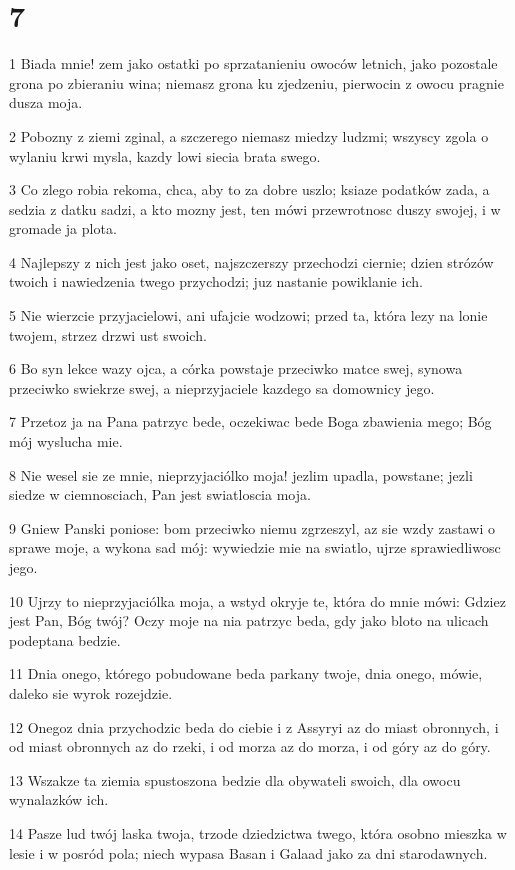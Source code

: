 \chapter{7}

\par 1 Biada mnie! zem jako ostatki po sprzatanieniu owoców letnich, jako pozostale grona po zbieraniu wina; niemasz grona ku zjedzeniu, pierwocin z owocu pragnie dusza moja.
\par 2 Pobozny z ziemi zginal, a szczerego niemasz miedzy ludzmi; wszyscy zgola o wylaniu krwi mysla, kazdy lowi siecia brata swego.
\par 3 Co zlego robia rekoma, chca, aby to za dobre uszlo; ksiaze podatków zada, a sedzia z datku sadzi, a kto mozny jest, ten mówi przewrotnosc duszy swojej, i w gromade ja plota.
\par 4 Najlepszy z nich jest jako oset, najszczerszy przechodzi ciernie; dzien strózów twoich i nawiedzenia twego przychodzi; juz nastanie powiklanie ich.
\par 5 Nie wierzcie przyjacielowi, ani ufajcie wodzowi; przed ta, która lezy na lonie twojem, strzez drzwi ust swoich.
\par 6 Bo syn lekce wazy ojca, a córka powstaje przeciwko matce swej, synowa przeciwko swiekrze swej, a nieprzyjaciele kazdego sa domownicy jego.
\par 7 Przetoz ja na Pana patrzyc bede, oczekiwac bede Boga zbawienia mego; Bóg mój wyslucha mie.
\par 8 Nie wesel sie ze mnie, nieprzyjaciólko moja! jezlim upadla, powstane; jezli siedze w ciemnosciach, Pan jest swiatloscia moja.
\par 9 Gniew Panski poniose: bom przeciwko niemu zgrzeszyl, az sie wzdy zastawi o sprawe moje, a wykona sad mój: wywiedzie mie na swiatlo, ujrze sprawiedliwosc jego.
\par 10 Ujrzy to nieprzyjaciólka moja, a wstyd okryje te, która do mnie mówi: Gdziez jest Pan, Bóg twój? Oczy moje na nia patrzyc beda, gdy jako bloto na ulicach podeptana bedzie.
\par 11 Dnia onego, którego pobudowane beda parkany twoje, dnia onego, mówie, daleko sie wyrok rozejdzie.
\par 12 Onegoz dnia przychodzic beda do ciebie i z Assyryi az do miast obronnych, i od miast obronnych az do rzeki, i od morza az do morza, i od góry az do góry.
\par 13 Wszakze ta ziemia spustoszona bedzie dla obywateli swoich, dla owocu wynalazków ich.
\par 14 Pasze lud twój laska twoja, trzode dziedzictwa twego, która osobno mieszka w lesie i w posród pola; niech wypasa Basan i Galaad jako za dni starodawnych.
